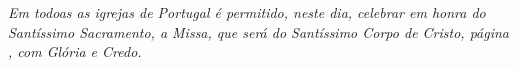 
\textit{Em todoas as igrejas de Portugal é permitido, neste dia, celebrar em honra do Santíssimo Sacramento, a Missa, que será do Santíssimo Corpo de Cristo, página \pageref{santissimocorpocristo}, com Glória e Credo.}
